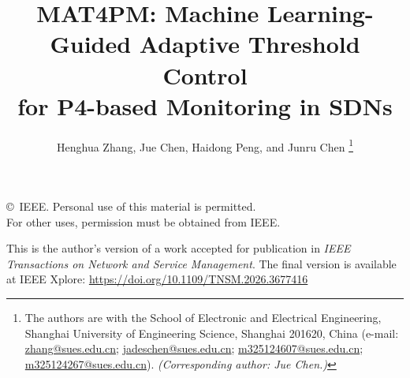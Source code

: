 \documentclass[twocolumn]{article}
\begin{document}
\title{MAT4PM: Machine Learning-Guided Adaptive Threshold Control\\
for P4-based Monitoring in SDNs}

\author{
    Henghua Zhang,
    Jue Chen, 
    Haidong Peng, 
    and Junru Chen
    \thanks{
        The authors are with the School of Electronic and Electrical Engineering, 
        Shanghai University of Engineering Science, 
        Shanghai 201620, China 
        (e-mail: \href{mailto:zhang@sues.edu.cn}{zhang@sues.edu.cn}; 
                 \href{mailto:jadeschen@sues.edu.cn}{jadeschen@sues.edu.cn}; 
                 \href{mailto:m325124607@sues.edu.cn}{m325124607@sues.edu.cn}; 
                 \href{mailto:m325124267@sues.edu.cn}{m325124267@sues.edu.cn}). 
        \textit{(Corresponding author: Jue Chen.)}
    }
}

\date{}

\maketitle

\begin{center}
\footnotesize{\copyright~IEEE. Personal use of this material is permitted.\\
For other uses, permission must be obtained from IEEE.}
\end{center}

\noindent
This is the author’s version of a work accepted for publication in 
\textit{IEEE Transactions on Network and Service Management}.  
The final version is available at IEEE Xplore:
\url{https://doi.org/10.1109/TNSM.2026.3677416}
\end{document}
